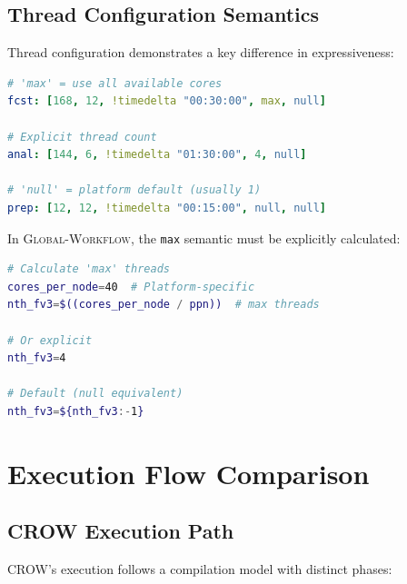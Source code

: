 \documentclass[11pt,twoside]{article}
\newcommand{\crow}{\textsc{CROW}}
\newcommand{\gw}{\textsc{Global-Workflow}}
\begin{document}
\subsection{Thread Configuration Semantics}

Thread configuration demonstrates a key difference in expressiveness:

\begin{lstlisting}[language=YAML, caption={\crow{} Thread Semantics}]
# 'max' = use all available cores
fcst: [168, 12, !timedelta "00:30:00", max, null]

# Explicit thread count
anal: [144, 6, !timedelta "01:30:00", 4, null]

# 'null' = platform default (usually 1)
prep: [12, 12, !timedelta "00:15:00", null, null]
\end{lstlisting}

In \gw{}, the \texttt{max} semantic must be explicitly calculated:

\begin{lstlisting}[language=Bash, caption={\gw{} Thread Calculation}]
# Calculate 'max' threads
cores_per_node=40  # Platform-specific
nth_fv3=$((cores_per_node / ppn))  # max threads

# Or explicit
nth_fv3=4

# Default (null equivalent)
nth_fv3=${nth_fv3:-1}
\end{lstlisting}

\section{Execution Flow Comparison}
\label{sec:execution}

\subsection{CROW Execution Path}

\crow{}'s execution follows a compilation model with distinct phases:
\end{document}
